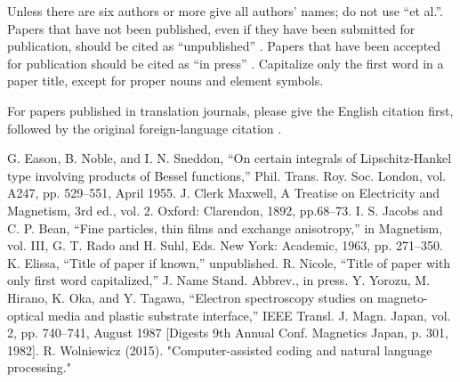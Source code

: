 \documentclass[conference]{IEEEtran}
\begin{document}
Unless there are six authors or more give all authors' names; do not use 
``et al.''. Papers that have not been published, even if they have been 
submitted for publication, should be cited as ``unpublished'' \cite{b4}. Papers 
that have been accepted for publication should be cited as ``in press'' \cite{b5}. 
Capitalize only the first word in a paper title, except for proper nouns and 
element symbols.

For papers published in translation journals, please give the English 
citation first, followed by the original foreign-language citation \cite{b6}.

\begin{thebibliography}{00}
 G. Eason, B. Noble, and I. N. Sneddon, ``On certain integrals of Lipschitz-Hankel type involving products of Bessel functions,'' Phil. Trans. Roy. Soc. London, vol. A247, pp. 529--551, April 1955.
 J. Clerk Maxwell, A Treatise on Electricity and Magnetism, 3rd ed., vol. 2. Oxford: Clarendon, 1892, pp.68--73.
 I. S. Jacobs and C. P. Bean, ``Fine particles, thin films and exchange anisotropy,'' in Magnetism, vol. III, G. T. Rado and H. Suhl, Eds. New York: Academic, 1963, pp. 271--350.
 K. Elissa, ``Title of paper if known,'' unpublished.
 R. Nicole, ``Title of paper with only first word capitalized,'' J. Name Stand. Abbrev., in press.
 Y. Yorozu, M. Hirano, K. Oka, and Y. Tagawa, ``Electron spectroscopy studies on magneto-optical media and plastic substrate interface,'' IEEE Transl. J. Magn. Japan, vol. 2, pp. 740--741, August 1987 [Digests 9th Annual Conf. Magnetics Japan, p. 301, 1982].
 R. Wolniewicz (2015). "Computer-assisted coding and natural language processing."
\end{thebibliography}
\end{document}
